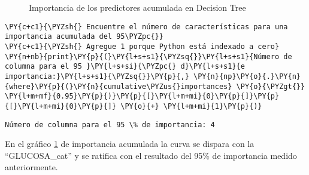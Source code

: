\begin{center}
    	\begin{figure}[H]
	\centering
	\caption{Importancia de los predictores acumulada en Decision Tree}
	\label{fig:ipadt}
	\end{figure}
\end{center}
    
    \begin{tcolorbox}[breakable, size=fbox, boxrule=1pt, pad at break*=1mm,colback=cellbackground, colframe=cellborder]
\begin{Verbatim}[commandchars=\\\{\}]
\PY{c+c1}{\PYZsh{} Encuentre el número de características para una importancia acumulada del 95\PYZpc{}}
\PY{c+c1}{\PYZsh{} Agregue 1 porque Python está indexado a cero}
\PY{n+nb}{print}\PY{p}{(}\PY{l+s+s1}{\PYZsq{}}\PY{l+s+s1}{Número de columna para el 95 }\PY{l+s+si}{\PYZpc{} d}\PY{l+s+s1}{e importancia:}\PY{l+s+s1}{\PYZsq{}}\PY{p}{,} \PY{n}{np}\PY{o}{.}\PY{n}{where}\PY{p}{(}\PY{n}{cumulative\PYZus{}importances} \PY{o}{\PYZgt{}} \PY{l+m+mf}{0.95}\PY{p}{)}\PY{p}{[}\PY{l+m+mi}{0}\PY{p}{]}\PY{p}{[}\PY{l+m+mi}{0}\PY{p}{]} \PY{o}{+} \PY{l+m+mi}{1}\PY{p}{)}
\end{Verbatim}
\end{tcolorbox}

    \begin{Verbatim}[commandchars=\\\{\}]
Número de columna para el 95 \% de importancia: 4
    \end{Verbatim}

    En el gráfico \ref{fig:ipadt} de importancia acumulada la curva se dispara con la
``GLUCOSA\_cat'' y se ratifica con el resultado del 95\% de importancia
medido anteriormente.



